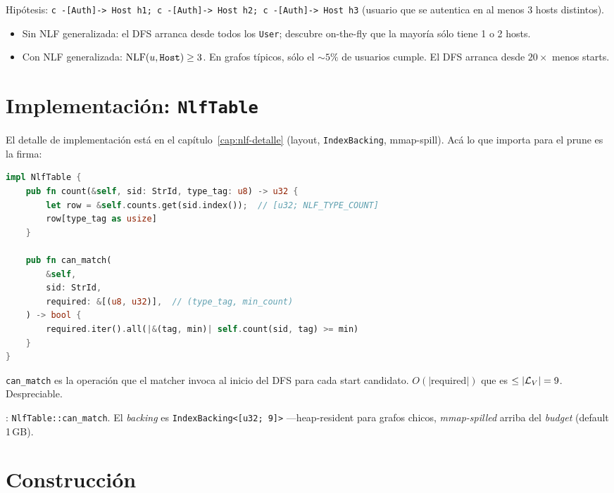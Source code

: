 Hipótesis: \texttt{c -[Auth]-> Host h1; c -[Auth]-> Host h2; c -[Auth]-> Host h3}
(usuario que se autentica en al menos 3 hosts distintos).

\begin{itemize}
    \item Sin NLF generalizada: el DFS arranca desde todos los
    \texttt{User}; descubre on-the-fly que la mayoría sólo tiene 1
    o 2 hosts.
    \item Con NLF generalizada: \(\mathrm{NLF}(u, \texttt{Host}) \geq 3\).
    En grafos típicos, sólo el \(\sim 5\%\) de usuarios cumple. El
    DFS arranca desde \(20\times\) menos starts.
\end{itemize}

\section{Implementación: \texttt{NlfTable}}

El detalle de implementación está en el capítulo~\ref{cap:nlf-detalle}
(layout, \texttt{IndexBacking}, mmap-spill). Acá lo que importa
para el prune es la firma:

\begin{lstlisting}[language=Rust]
impl NlfTable {
    pub fn count(&self, sid: StrId, type_tag: u8) -> u32 {
        let row = &self.counts.get(sid.index());  // [u32; NLF_TYPE_COUNT]
        row[type_tag as usize]
    }

    pub fn can_match(
        &self,
        sid: StrId,
        required: &[(u8, u32)],  // (type_tag, min_count)
    ) -> bool {
        required.iter().all(|&(tag, min)| self.count(sid, tag) >= min)
    }
}
\end{lstlisting}

\noindent
\texttt{can\_match} es la operación que el matcher invoca al inicio
del DFS para cada start candidato. \(O(|\text{required}|)\) que
es \(\leq |\mathcal{L}_V| = 9\). Despreciable.

\begin{enelcodigo}
: \texttt{NlfTable::can\_match}.
El \emph{backing} es \texttt{IndexBacking<[u32; 9]>} ---heap-resident
para grafos chicos, \emph{mmap-spilled} arriba del \emph{budget}
(default 1\,GB).
\end{enelcodigo}

\section{Construcción}

